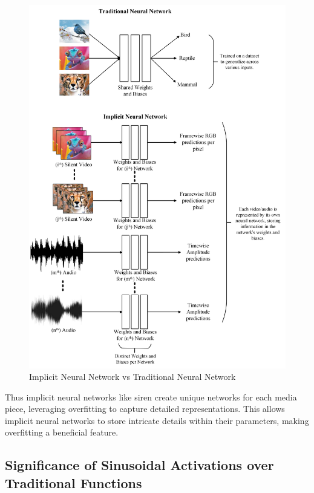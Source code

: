     \begin{figure}[H]
        \centering
        \includegraphics[width=0.95\linewidth]{assets/why overfitting.png}
        \caption{Implicit Neural Network vs Traditional Neural Network}
        \label{fig:implicit-vs-traditional}
    \end{figure}

    Thus implicit neural networks like \gls{siren} create unique networks for each media piece, leveraging overfitting to capture detailed representations. This allows implicit neural networks to store intricate details within their parameters, making overfitting a beneficial feature.
    
    
    \subsection{Significance of Sinusoidal Activations over Traditional Functions}


